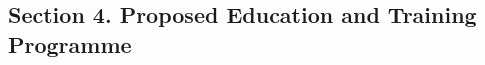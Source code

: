 \documentclass[12pt]{article}
\begin{document}





\subsection*{Section 4. Proposed Education and Training Programme}
\end{document}
